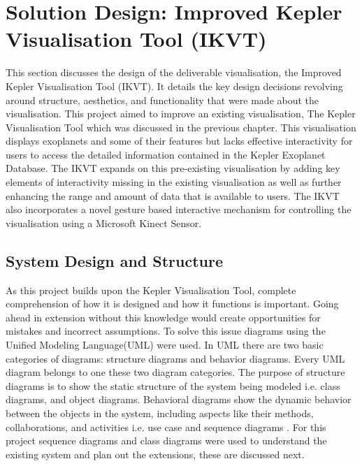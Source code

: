 \chapter{Solution Design: Improved Kepler Visualisation Tool (IKVT)}\label{C:sd}
This section discusses the design of the deliverable visualisation, the Improved
Kepler Visualisation Tool (IKVT). It details
the key design decisions revolving around structure, aesthetics, and
functionality that were made about the visualisation. 
This project aimed to improve an existing visualisation, The Kepler
Visualisation
Tool which was discussed in the previous chapter. This 
visualisation displays exoplanets and some of their features but lacks effective
interactivity for users to access the detailed information contained in the
Kepler Exoplanet Database. The IKVT expands on this pre-existing
visualisation by adding key elements of interactivity missing in the existing
 visualisation as well as further enhancing the range and amount of data that
is available to users. The IKVT also incorporates a novel
gesture based interactive mechanism for controlling the visualisation using a
Microsoft
Kinect Sensor.

\section{System Design and Structure}
As this project builds upon the Kepler Visualisation
Tool, complete comprehension of
how it is designed and how it functions is important. Going ahead in extension
without this knowledge would create opportunities
for mistakes and incorrect assumptions. To solve this issue diagrams using the
Unified Modeling Language(UML) were used. In UML there are two basic categories
of diagrams: structure diagrams and
behavior diagrams. Every UML diagram belongs to one these two diagram
categories. The purpose of structure diagrams is to show the static structure of
the system being modeled i.e. class diagrams, and object diagrams. Behavioral
diagrams show the dynamic behavior between the objects in
the system, including aspects like their methods, collaborations, and activities
i.e. use case and sequence diagrams \cite{ibm}. For this project sequence
diagrams and class diagrams were used to
understand the existing system and plan out the extensions, these are discussed
next.

